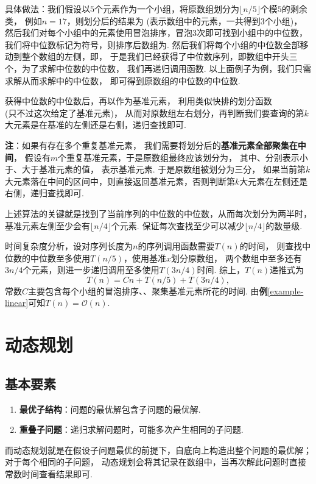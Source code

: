 \documentclass[12pt, a4paper, oneside]{ctexart}
\numberwithin{equation}{section}  %
\theoremstyle{definition}
\def\O{\mathcal{O}}         %
\begin{document}
具体做法：我们假设以$5$个元素作为一个小组，将原数组划分为$\lfloor n/5\rfloor$个模$5$的剩余类，
例如$n=17$，则划分后的结果为\cppinline{[*****|*****|*****|**]}
(\cppinline{*}表示数组中的元素，一共得到$3$个小组)，
然后我们对每个小组中的元素使用冒泡排序，冒泡$3$次即可找到小组中的中位数，
我们将中位数标记为\cppinline{$}符号，则排序后数组为\cppinline{[**$**|**$**|**$**|**]}. 
然后我们将每个小组的中位数全部移动到整个数组的左侧，即\cppinline{[$$$**|*****|*****|**]}，
于是我们已经获得了中位数序列，即数组中开头三个，为了求解中位数的中位数，
我们再递归调用函数. 
以上面例子为例，我们只需求解从而求解\cppinline{[$$$]}中的中位数，
即可得到原数组的中位数的中位数.

获得中位数的中位数后，再以作为基准元素，
利用类似快排的划分函数\\
(只不过这次给定了基准元素)，
从而对原数组左右划分，再判断我们要查询的第$k$大元素是在基准的左侧还是右侧，递归查找即可.

\textbf{注}：如果有存在多个重复基准元素，
我们需要将划分后的\textbf{基准元素全部聚集在中间}，
假设有$m$个重复基准元素，于是原数组最终应该划分为\cppinline{[00000|$$$$|11111]}，
其中、分别表示小于、大于基准元素的值，
\cppinline{$}表示基准元素. 于是原数组被划分为三分，
如果当前第$k$大元素落在中间的区间中，则直接返回基准元素，否则判断第$k$大元素在左侧还是右侧，递归查找即可.

上述算法的关键就是找到了当前序列的中位数的中位数，从而每次划分为两半时，
基准元素左侧至少会有$\lfloor n/4\rfloor$个元素. 保证每次查找至少可以减少$\lfloor n/4\rfloor$的数量级.

时间复杂度分析，设对序列长度为$n$的序列调用函数需要$T(n)$的时间，
则查找中位数的中位数至多使用$T(n/5)$，使用基准$x$划分原数组，{}
两个数组中至多还有$3n/4$个元素，则进一步递归调用至多使用$T(3n/4)$时间. 综上，$T(n)$递推式为
\begin{equation*}
    T(n) = Cn+T(n/5)+T(3n/4),
\end{equation*}
常数$C$主要包含每个小组的冒泡排序、、聚集基准元素所花的时间. 
由\textbf{例}\ref{example-linear}可知$T(n) = \O(n)$.
\section{动态规划}
\subsection{基本要素}
\begin{enumerate}
    \item \textbf{最优子结构}：问题的最优解包含子问题的最优解.
    \item \textbf{重叠子问题}：递归求解问题时，可能多次产生相同的子问题.
\end{enumerate}
而动态规划就是在假设子问题最优的前提下，自底向上构造出整个问题的最优解；对于每个相同的子问题，
动态规划会将其记录在数组中，当再次解此问题时直接常数时间查看结果即可.
\end{document}
